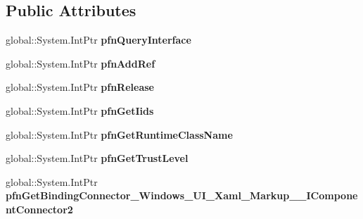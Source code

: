 \subsection*{Public Attributes}
\begin{DoxyCompactItemize}
\item 
\mbox{\label{struct_windows_1_1_u_i_1_1_xaml_1_1_markup_1_1_i_component_connector2_____impl_1_1_vtbl_a80687c44e8d1246f804a56ca9625f04a}} 
global\+::\+System.\+Int\+Ptr {\bfseries pfn\+Query\+Interface}
\item 
\mbox{\label{struct_windows_1_1_u_i_1_1_xaml_1_1_markup_1_1_i_component_connector2_____impl_1_1_vtbl_aa7a7ff67cb4f1a89f2f5f53f6d3e3497}} 
global\+::\+System.\+Int\+Ptr {\bfseries pfn\+Add\+Ref}
\item 
\mbox{\label{struct_windows_1_1_u_i_1_1_xaml_1_1_markup_1_1_i_component_connector2_____impl_1_1_vtbl_a4648bbb893326fc161bbf4a436c7dc36}} 
global\+::\+System.\+Int\+Ptr {\bfseries pfn\+Release}
\item 
\mbox{\label{struct_windows_1_1_u_i_1_1_xaml_1_1_markup_1_1_i_component_connector2_____impl_1_1_vtbl_a0f66d3d62f1ad06efd2dec109774a21c}} 
global\+::\+System.\+Int\+Ptr {\bfseries pfn\+Get\+Iids}
\item 
\mbox{\label{struct_windows_1_1_u_i_1_1_xaml_1_1_markup_1_1_i_component_connector2_____impl_1_1_vtbl_ac34fa400ba5d6026fd8a82eba0f6fb74}} 
global\+::\+System.\+Int\+Ptr {\bfseries pfn\+Get\+Runtime\+Class\+Name}
\item 
\mbox{\label{struct_windows_1_1_u_i_1_1_xaml_1_1_markup_1_1_i_component_connector2_____impl_1_1_vtbl_ab5f8ffbe202c5a084d14467d5ffd7e8b}} 
global\+::\+System.\+Int\+Ptr {\bfseries pfn\+Get\+Trust\+Level}
\item 
\mbox{\label{struct_windows_1_1_u_i_1_1_xaml_1_1_markup_1_1_i_component_connector2_____impl_1_1_vtbl_af527f16e5cdc0a4e2188a7fdcef4c971}} 
global\+::\+System.\+Int\+Ptr {\bfseries pfn\+Get\+Binding\+Connector\+\_\+\+Windows\+\_\+\+U\+I\+\_\+\+Xaml\+\_\+\+Markup\+\_\+\+\_\+\+I\+Component\+Connector2}
\end{DoxyCompactItemize}
